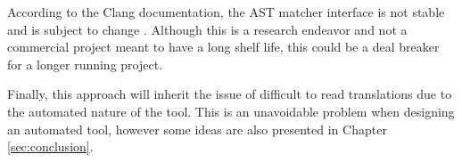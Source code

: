 According to the Clang documentation, the AST matcher interface is not stable and is subject to change \cite{clang-interfaces}. Although this is a research endeavor and not a commercial project meant to have a long shelf life, this could be a deal breaker for a longer running project.

Finally, this approach will inherit the issue of difficult to read translations due to the automated nature of the tool. This is an unavoidable problem when designing an automated tool, however some ideas are also presented in Chapter \ref{sec:conclusion}.